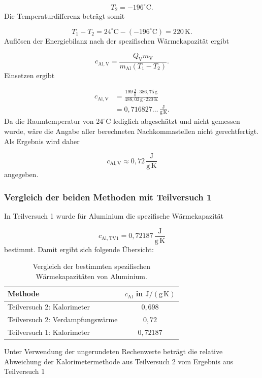 \documentclass{report}
\begin{document}
\begin{equation}
T_2=-196^\circ\mathrm{C}.
\end{equation}
\noindent
Die Temperaturdifferenz beträgt somit

\begin{equation}
T_1-T_2
=
24^\circ\mathrm{C}-(-196^\circ\mathrm{C})
=
220\,\mathrm{K}.
\end{equation}
\noindent
Auflösen der Energiebilanz nach der spezifischen Wärmekapazität ergibt

\begin{equation}
c_\mathrm{Al,V}
=
\frac{
Q_\mathrm{V}m_\mathrm{V}
}{
m_\mathrm{Al}(T_1-T_2)
}.
\end{equation}
\noindent
Einsetzen ergibt

\begin{align}
c_\mathrm{Al,V}
&=
\frac{
199\,\frac{\mathrm{J}}{\mathrm{g}}
\cdot386{,}75\,\mathrm{g}
}{
488{,}03\,\mathrm{g}
\cdot220\,\mathrm{K}
}\\
&=
0{,}716827\ldots\,
\frac{\mathrm{J}}{\mathrm{g\,K}}.
\end{align}
\noindent
Da die Raumtemperatur von $24^\circ\mathrm{C}$ lediglich abgeschätzt und nicht
gemessen wurde, wäre die Angabe aller berechneten Nachkommastellen nicht
gerechtfertigt. Als Ergebnis wird daher

\begin{equation}
\boxed{
c_\mathrm{Al,V}
\approx
0{,}72\,\frac{\mathrm{J}}{\mathrm{g\,K}}
}
\end{equation}
\noindent
angegeben.


\subsubsection{Vergleich der beiden Methoden mit Teilversuch 1}
\noindent
In Teilversuch 1 wurde für Aluminium die spezifische Wärmekapazität

\begin{equation}
c_\mathrm{Al,TV1}
=
0{,}72187\,\frac{\mathrm{J}}{\mathrm{g\,K}}
\end{equation}
\noindent
bestimmt.
\noindent
Damit ergibt sich folgende Übersicht:

\begin{table}[htbp]
    \centering
    \caption{Vergleich der bestimmten spezifischen Wärmekapazitäten von Aluminium.}
    \label{tab:vergleich_tv2}
    \begin{tabular}{l|c}
        \hline
        Methode &
        $c_\mathrm{Al}$ in $\mathrm{J/(g\,K)}$\\
        \hline
        Teilversuch 2: Kalorimeter
        & $0{,}698$\\
        Teilversuch 2: Verdampfungswärme
        & $0{,}72$\\
        Teilversuch 1: Kalorimeter
        & $0{,}72187$\\
        \hline
    \end{tabular}
\end{table}
\noindent
Unter Verwendung der ungerundeten Rechenwerte beträgt die relative Abweichung
der Kalorimetermethode aus Teilversuch 2 vom Ergebnis aus Teilversuch 1
\end{document}
